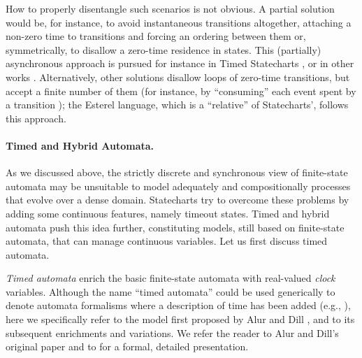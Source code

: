 How to properly disentangle such scenarios is not obvious. A 
partial solution would be, for instance, to avoid instantaneous 
transitions altogether, attaching a non-zero time to transitions 
and forcing an ordering between them or, symmetrically, to disallow 
a zero-time residence in states. This (partially) asynchronous 
approach is pursued for instance in Timed Statecharts \cite{KP92}, 
or in other works \cite{Per93}. Alternatively, other solutions disallow 
loops of zero-time transitions, but accept a finite number of 
them (for instance, by ``consuming'' each event spent by a transition \cite{HN96});
the Esterel language, which is a ``relative'' of Statecharts', follows this approach. 


\paragraph{Timed and Hybrid Automata.}
As we discussed above, the strictly discrete and synchronous view of
finite-state automata may be unsuitable to model adequately and
compositionally processes that evolve over a dense domain.
Statecharts try to overcome these problems by adding some continuous
features, namely timeout states. Timed and hybrid automata push this
idea further, constituting models, still based on finite-state
automata, that can manage continuous variables. Let us first discuss
timed automata.

\emph{Timed automata} enrich the basic finite-state automata with 
real-valued \emph{clock} variables. Although the name ``timed automata'' 
could be used generically to denote automata formalisms where 
a description of time has been added (e.g., \cite{LV96,AH96,Arc00}), 
here we specifically refer to the model first proposed by Alur 
and Dill \cite{AD94}, and to its subsequent enrichments and variations. 
We refer the reader to Alur and Dill's original paper \cite{AD94} and to \cite{BY04} 
for a formal, detailed presentation.

